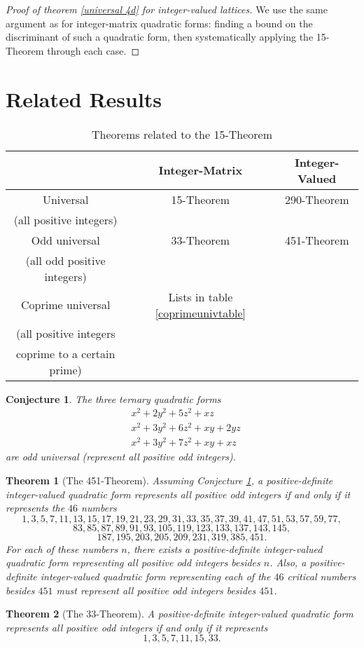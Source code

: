 \documentclass[letterpaper, 12pt]{article}
\newtheorem{thm}{Theorem}
\newtheorem{conj}{Conjecture}
\begin{document}
\begin{proof}[Proof of theorem \ref{universal 4d} for integer-valued lattices]
    We use the same argument as for integer-matrix quadratic forms: finding a bound on the discriminant of such a quadratic form, then systematically applying the 15-Theorem through each case.
\end{proof}

\section{Related Results}

\begin{table}[H]
    \begin{tabular}{|c|c|c|}
        \hline
        & Integer-Matrix & Integer-Valued \\ \hline
        Universal & 15-Theorem & 290-Theorem \\
        (all positive integers) && \\ \hline
        Odd universal & 33-Theorem & 451-Theorem \\
        (all odd positive integers) && \\ \hline
        Coprime universal & Lists in table \ref{coprimeunivtable} & \\
        (all positive integers && \\
        coprime to a certain prime) && \\ \hline
    \end{tabular}
    \caption{Theorems related to the 15-Theorem}
\end{table}
\begin{conj}\label{451thmconj}
    The three ternary quadratic forms
    \begin{align*}
        & x^2 + 2y^2 + 5z^2 + xz \\
        & x^2 + 3y^2 + 6z^2 + xy + 2yz \\
        & x^2 + 3y^2 + 7z^2 + xy + xz
    \end{align*}
    are odd universal (represent all positive odd integers).
\end{conj}
\begin{thm}[The 451-Theorem]
    Assuming Conjecture \ref{451thmconj}, a positive-definite integer-valued quadratic form represents all positive \emph{odd} integers if and only if it represents the $46$ numbers
    \[1, 3, 5, 7, 11, 13, 15, 17, 19, 21, 23, 29, 31, 33, 35, 37, 39, 41, 47, 51, 53, 57, 59, 77,\]
    \[83, 85, 87, 89, 91, 93, 105, 119, 123, 133, 137, 143, 145,\]
    \[187, 195, 203, 205, 209, 231, 319, 385, 451.\]
    For each of these numbers $n$, there exists a positive-definite integer-valued quadratic form representing all positive odd integers besides $n$. Also, a positive-definite integer-valued quadratic form representing each of the $46$ critical numbers besides $451$ must represent all positive odd integers besides $451$.
\end{thm}
\begin{thm}[The 33-Theorem]
    A positive-definite integer-valued quadratic form represents all positive odd integers if and only if it represents
    \[1, 3, 5, 7, 11, 15, 33.\]
\end{thm}
\end{document}
